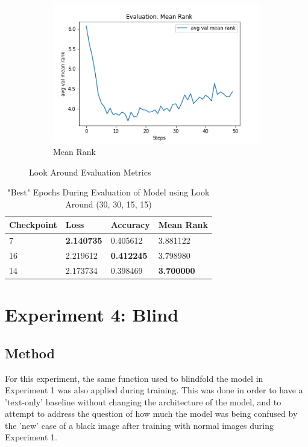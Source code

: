 \begin{figure}[H]
\begin{subfigure}[b]{0.3\textwidth}
         \includegraphics[width=\textwidth]{./figure/results/look_around/eval/avg val mean rank.png}
         \caption{Mean Rank}
         \label{fig:la_e_mean_rank}
     \end{subfigure}
     \caption{Look Around Evaluation Metrics}
     \label{fig:la_e_metrics}
\end{figure}


\begin{table}[H]
\centering
\caption{"Best" Epochs During Evaluation of Model using Look Around (30, 30, 15, 15)}
\begin{tabular}{l | l | l | l}
Checkpoint & Loss & Accuracy & Mean Rank \\
\hline
7 & \textbf{2.140735} & 0.405612 & 3.881122 \\
16 & 2.219612 & \textbf{0.412245} & 3.798980 \\
14 & 2.173734 & 0.398469 & \textbf{3.700000} 
\end{tabular}
\label{tab:best_look_around}
\end{table}

\section{Experiment 4: Blind}
\subsection{Method}
For this experiment, the same function used to blindfold the model in Experiment 1 was also applied during training. This was done in order to have a 'text-only' baseline without changing the architecture of the model, and to attempt to address the question of how much the model was being confused by the 'new' case of a black image after training with normal images during Experiment 1. 

